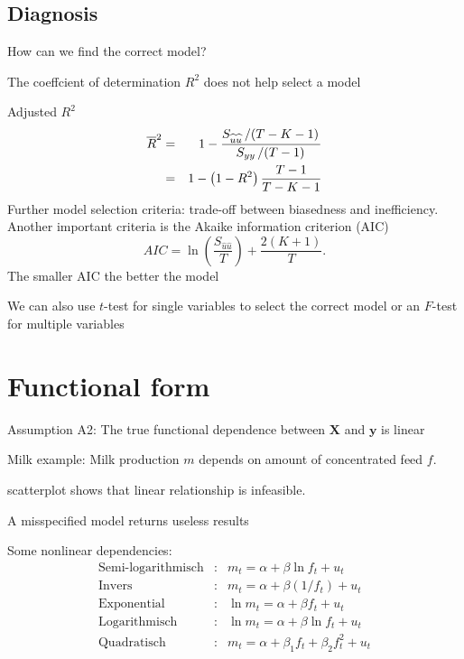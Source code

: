 \documentclass{article}
\begin{document}
\subsection*{Diagnosis}
How can we find the correct model?

The coeffcient of determination $R^{2}$ does not help select a model

Adjusted $R^{2}$
\begin{eqnarray*}
\overline{R}^{2} &=&1-\frac{S_{\widehat{u}\widehat{u}}\left/ \left(
T-K-1\right) \right. }{S_{yy}\left/ \left( T-1\right) \right. } \\
&=&1-\left( 1-R^{2}\right) \frac{T-1}{T-K-1}
\end{eqnarray*}
Further model selection criteria: trade-off between biasedness and inefficiency. Another important criteria is the Akaike information criterion (AIC)
\[ AIC=\ln \left( \frac{S_{\widehat{u}\widehat{u}}}{T}\right) +\frac{2(K+1)}{T}. \]
The smaller AIC the better the model

We can also use $t$-test for single variables to select the correct model or an $F$-test for multiple variables

\section{Functional form}

Assumption A2: The true functional dependence between $\mathbf{X}$ and 
$\mathbf{y}$ is linear

Milk example: Milk production $m$ depends on amount of concentrated
feed $f$.

scatterplot shows that linear relationship is infeasible.

 A misspecified model returns useless results

Some nonlinear dependencies:
\begin{eqnarray*}
\text{Semi-logarithmisch} &\text{:}&m_{t}=\alpha +\beta \ln f_{t}+u_{t} \\
\text{Invers} &\text{:}&m_{t}=\alpha +\beta \left( 1/f_{t}\right) +u_{t} \\
\text{Exponential} &\text{:}&\ln m_{t}=\alpha +\beta f_{t}+u_{t} \\
\text{Logarithmisch} &\text{:}&\ln m_{t}=\alpha +\beta \ln f_{t}+u_{t} \\
\text{Quadratisch} &:&m_{t}=\alpha +\beta _{1}f_{t}+\beta _{2}f_{t}^{2}+u_{t}
\end{eqnarray*}
\end{document}
